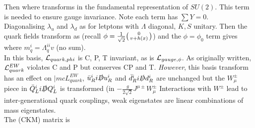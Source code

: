 \documentclass{article}
\begin{document}
Then 
where 
transforms in the fundamental representation of $SU(2)$. This term is needed to ensure gauge invariance. Note each term has $\sum Y = 0$. \\
Diagonalising $\lambda_u$ and $\lambda_d$ as for letptons 
with $\Lambda$ diagonal, $K,S$ unitary. Then the quark fields transform as 
(recall $ \phi = \frac{1}{\sqrt{2}} \begin{psmallmatrix} 0 \\ v+h(x) \end{psmallmatrix}$) and the $\phi = \phi_0$ term gives 
where $m_q^i = \Lambda_q^{ii} v$ (no sum). \\
In this basis, $\mathcal{L}_{quark, phi}$ is C, P, T invariant, as is $\mathcal{L}_{gauge,\phi}$. As originally written, $\mathcal{L}_{quark}^{EW}$ violates C and P but conserves CP and T. \emph{However}, this basis transform has an effect on $|mc{L}_{quark}^{EW}$, $\bar{u}_R^i i \slashed{D} u_R^i $ and $\bar{d}_R^i i \slashed{D} d_R^i $ are unchanged but the $W_\mu^\pm$ piece in $\bar{Q}_L^i i \slashed{D} Q_L^i$ is transformed (in $-\frac{g}{2\sqrt{2}} J^{\mu \pm} W_\mu^{\pm}$
Interactions with $W^\pm$ lead to inter-generational quark couplings, weak eigenstates are linear combinations of mass eigenstates. \\
The  (CKM) matrix is 
\end{document}
